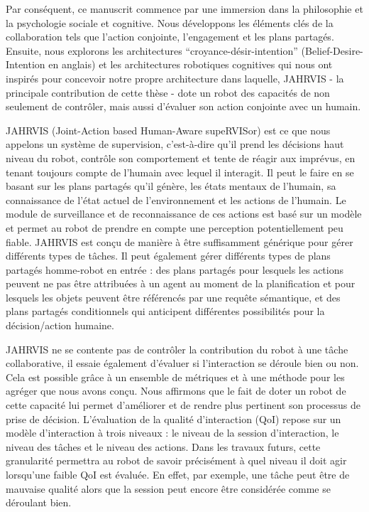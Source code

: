 \documentclass[english,a4paper,11pt,twoside]{StyleThese}
\begin{document}
\begin{vcenterpage}
Par conséquent, ce manuscrit commence par une immersion dans la philosophie et la psychologie sociale et cognitive. Nous développons les éléments clés de la collaboration tels que l'action conjointe, l'engagement et les plans partagés. Ensuite, nous explorons les architectures “croyance-désir-intention” (Belief-Desire-Intention en anglais) et les architectures robotiques cognitives qui nous ont inspirés pour concevoir notre propre architecture dans laquelle, JAHRVIS - la principale contribution de cette thèse - dote un robot des capacités de non seulement de contrôler, mais aussi d'évaluer son action conjointe avec un humain. 


JAHRVIS (Joint-Action based Human-Aware supeRVISor) est ce que nous appelons un système de supervision, c'est-à-dire qu'il prend les décisions haut niveau du robot, contrôle son comportement et tente de réagir aux imprévus, en tenant toujours compte de l'humain avec lequel il interagit. Il peut le faire en se basant sur les plans partagés qu’il génère, les états mentaux de l'humain, sa connaissance de l'état actuel de l'environnement et les actions de l'humain. Le module de surveillance et de reconnaissance de ces actions est basé sur un modèle et permet au robot de prendre en compte une perception potentiellement peu fiable. JAHRVIS est conçu de manière à être suffisamment générique pour gérer différents types de tâches. Il peut également gérer différents types de plans partagés homme-robot en entrée : des plans partagés pour lesquels les actions peuvent ne pas être attribuées à un agent au moment de la planification et pour lesquels les objets peuvent être référencés par une requête sémantique, et des plans partagés conditionnels qui anticipent différentes possibilités pour la décision/action humaine. 


JAHRVIS ne se contente pas de contrôler la contribution du robot à une tâche collaborative, il essaie également d'évaluer si l'interaction se déroule bien ou non. Cela est possible grâce à un ensemble de métriques et à une méthode pour les agréger que nous avons conçu. Nous affirmons que le fait de doter un robot de cette capacité lui permet d'améliorer et de rendre plus pertinent son processus de prise de décision. L'évaluation de la qualité d’interaction (QoI) repose sur un modèle d'interaction à trois niveaux : le niveau de la session d'interaction, le niveau des tâches et le niveau des actions. Dans les travaux futurs, cette granularité permettra au robot de savoir précisément à quel niveau il doit agir lorsqu'une faible QoI est évaluée. En effet, par exemple, une tâche peut être de mauvaise qualité alors que la session peut encore être considérée comme se déroulant bien.



\end{vcenterpage}
\end{document}
